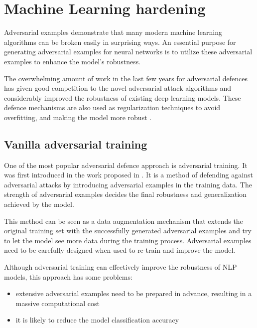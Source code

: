 \section{Machine Learning hardening}\label{sec:ml-hardening}
Adversarial examples demonstrate that many modern machine learning algorithms can be broken easily in surprising ways. 
An essential purpose for generating adversarial examples for neural networks is to utilize these adversarial examples to enhance the model's robustness.

The overwhelming amount of work in the last few years for adversarial defences has given good competition to the novel adversarial attack algorithms and considerably improved the robustness of existing deep learning models. These defence mechanisms are also used as regularization techniques to avoid overfitting, and making the model more robust \cite{https://doi.org/10.48550/arxiv.2203.06414}.

\subsection{Vanilla adversarial training}\label{subsec:adversarial-training}
One of the most popular adversarial defence approach is adversarial training.
It was first introduced in the work proposed in \cite{goodfellow2014explaining}. 
It is a method of defending against adversarial attacks by introducing adversarial examples in the training data. 
The strength of adversarial examples decides the final robustness and generalization achieved by the model.

This method can be seen as a data augmentation mechanism that extends the original training set with the successfully generated adversarial examples and try to let the model see more data during the training process.
Adversarial examples need to be carefully designed when used to  re-train and improve the model.

Although adversarial training can effectively improve the robustness of NLP models, this approach has some problems: 
\begin{itemize}
    \item extensive adversarial examples need to be prepared in advance, resulting in a massive computational cost
    \item it is likely to reduce the model classification accuracy
\end{itemize}

